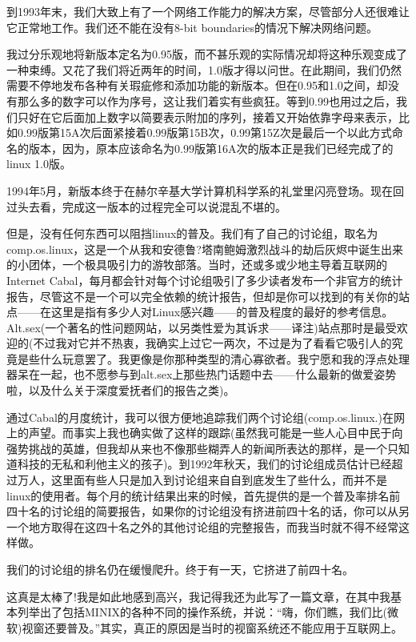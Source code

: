 到1993年末，我们大致上有了一个网络工作能力的解决方案，尽管部分人还很难让它正常地工作。我们还不能在没有8-bit boundaries的情况下解决网络问题。

我过分乐观地将新版本定名为0.95版，而不甚乐观的实际情况却将这种乐观变成了一种束缚。又花了我们将近两年的时间，1.0版才得以问世。在此期间，我们仍然需要不停地发布各种有关瑕疵修和添加功能的新版本。但在0.95和1.0之间，却没有那么多的数字可以作为序号，这让我们着实有些疯狂。等到0.99也用过之后，我们只好在它后面加上数字以简要表示附加的序列，接着又开始依靠字母来表示，比如0.99版第15A次后面紧接着0.99版第15B次，0.99第15Z次是最后一个以此方式命名的版本，因为，原本应该命名为0.99版第16A次的版本正是我们已经完成了的linux 1.0版。

1994年5月，新版本终于在赫尔辛基大学计算机科学系的礼堂里闪亮登场。现在回过头去看，完成这一版本的过程完全可以说混乱不堪的。

但是，没有任何东西可以阻挡linux的普及。我们有了自己的讨论组，取名为comp.os.linux，这是一个从我和安德鲁?塔南鲍姆激烈战斗的劫后灰烬中诞生出来的小团体，一个极具吸引力的游牧部落。当时，还或多或少地主导着互联网的Internet Cabal，每月都会针对每个讨论组吸引了多少读者发布一个非官方的统计报告，尽管这不是一个可以完全依赖的统计报告，但却是你可以找到的有关你的站点——在这里是指有多少人对Linux感兴趣——的普及程度的最好的参考信息。Alt.sex(一个著名的性问题网站，以另类性爱为其诉求——译注)站点那时是最受欢迎的(不过我对它并不热衷，我确实上过它一两次，不过是为了看看它吸引人的究竟是些什么玩意罢了。我更像是你那种类型的清心寡欲者。我宁愿和我的浮点处理器呆在一起，也不愿参与到alt.sex上那些热门话题中去——什么最新的做爱姿势啦，以及什么关于深度爱抚者们的报告之类)。

通过Cabal的月度统计，我可以很方便地追踪我们两个讨论组(comp.os.linux.)在网上的声望。而事实上我也确实做了这样的跟踪(虽然我可能是一些人心目中民于向强势挑战的英雄，但我却从来也不像那些糊弄人的新闻所表达的那样，是一个只知道科技的无私和利他主义的孩子)。到1992年秋天，我们的讨论组成员估计已经超过万人，这里面有些人只是加入到讨论组来自自到底发生了些什么，而并不是linux的使用者。每个月的统计结果出来的时候，首先提供的是一个普及率排名前四十名的讨论组的简要报告，如果你的讨论组没有挤进前四十名的话，你可以从另一个地方取得在这四十名之外的其他讨论组的完整报告，而我当时就不得不经常这样做。

我们的讨论组的排名仍在缓慢爬升。终于有一天，它挤进了前四十名。

这真是太棒了!我是如此地感到高兴，我记得我还为此写了一篇文章，在其中我基本列举出了包括MINIX的各种不同的操作系统，并说：“嗨，你们瞧，我们比(微软)视窗还要普及。”其实，真正的原因是当时的视窗系统还不能应用于互联网上。

